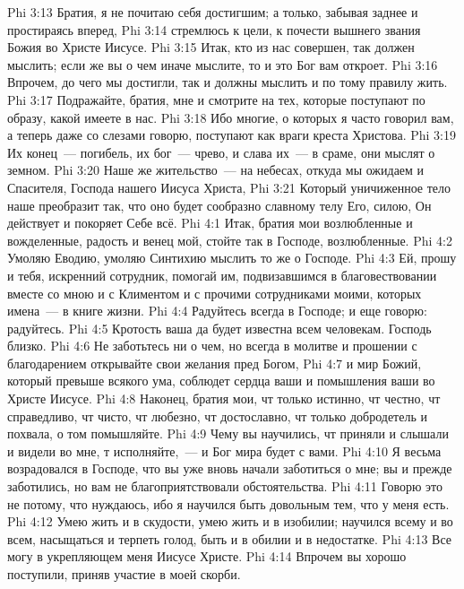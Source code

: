 \vs Phi 3:13 Братия, я не почитаю себя достигшим; а только, забывая заднее и простираясь вперед,
\vs Phi 3:14 стремлюсь к цели, к почести вышнего звания Божия во Христе Иисусе.
\vs Phi 3:15 Итак, кто из нас совершен, так должен мыслить; если же вы о чем иначе мыслите, то и это Бог вам откроет.
\vs Phi 3:16 Впрочем, до чего мы достигли, так и должны мыслить и по тому правилу жить.
\rsbpar\vs Phi 3:17 Подражайте, братия, мне и смотрите на тех, которые поступают по образу, какой имеете в нас.
\vs Phi 3:18 Ибо многие, о которых я часто говорил вам, а теперь даже со слезами говорю, поступают как враги креста Христова.
\vs Phi 3:19 Их конец~--- погибель, их бог~--- чрево, и слава их~--- в сраме, они мыслят о земном.
\vs Phi 3:20 Наше же жительство~--- на небесах, откуда мы ожидаем и Спасителя, Господа нашего Иисуса Христа,
\vs Phi 3:21 Который уничиженное тело наше преобразит так, что оно будет сообразно славному телу Его, силою,  Он действует и покоряет Себе всё.
\vs Phi 4:1 Итак, братия мои возлюбленные и вожделенные, радость и венец мой, стойте так в Господе, возлюбленные.
\rsbpar\vs Phi 4:2 Умоляю Еводию, умоляю Синтихию мыслить то же о Господе.
\vs Phi 4:3 Ей, прошу и тебя, искренний сотрудник, помогай им, подвизавшимся в благовествовании вместе со мною и с Климентом и с прочими сотрудниками моими, которых имена~--- в книге жизни.
\rsbpar\vs Phi 4:4 Радуйтесь всегда в Господе; и еще говорю: радуйтесь.
\vs Phi 4:5 Кротость ваша да будет известна всем человекам. Господь близко.
\vs Phi 4:6 Не заботьтесь ни о чем, но всегда в молитве и прошении с благодарением открывайте свои желания пред Богом,
\vs Phi 4:7 и мир Божий, который превыше всякого ума, соблюдет сердца ваши и помышления ваши во Христе Иисусе.
\rsbpar\vs Phi 4:8 Наконец, братия мои, чт только истинно, чт честно, чт справедливо, чт чисто, чт любезно, чт достославно, чт только добродетель и похвала, о том помышляйте.
\vs Phi 4:9 Чему вы научились, чт приняли и слышали и видели во мне, т исполняйте,~--- и Бог мира будет с вами.
\rsbpar\vs Phi 4:10 Я весьма возрадовался в Господе, что вы уже вновь начали заботиться о мне; вы и прежде заботились, но вам не благоприятствовали обстоятельства.
\vs Phi 4:11 Говорю это не потому, что нуждаюсь, ибо я научился быть довольным тем, что у меня есть.
\vs Phi 4:12 Умею жить и в скудости, умею жить и в изобилии; научился всему и во всем, насыщаться и терпеть голод, быть и в обилии и в недостатке.
\vs Phi 4:13 Все могу в укрепляющем меня Иисусе Христе.
\vs Phi 4:14 Впрочем вы хорошо поступили, приняв участие в моей скорби.
